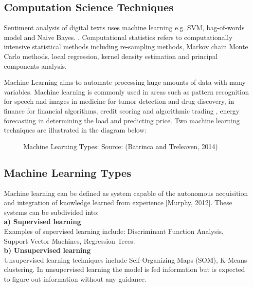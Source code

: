 \subsection{Computation Science Techniques}
Sentiment analysis of digital texts uses machine learning e.g.  SVM, bag-of-words model and Naive Bayes.
\cite{ref26}. Computational statistics refers to computationally intensive statistical methods
including re-sampling methods, Markov chain Monte Carlo methods, local regression, kernel
density estimation and principal components analysis. 

Machine Learning aims to automate processing huge amounts of data with many variables. Machine learning is commonly used in areas such as pattern recognition for speech and  images
in medicine for tumor detection and drug discovery, in finance for financial algorithms, credit scoring and algorithmic trading \cite{ref27}, energy forecasting in determining the load and predicting price.
Two machine learning techniques are illustrated in the diagram below:


\begin{figure}[h]
  \centering
  \caption[Machine learning types]%
  {Machine Learning Types: Source: (Batrinca and Treleaven, 2014)}
  \label{fig:ALAP:sm3}
\end{figure}


\clearpage
\subsection{Machine Learning Types}

Machine learning can be defined as system capable of the autonomous acquisition and integration of knowledge learned from experience [Murphy, 2012].
These systems can be subdivided into:
\leavevmode\\
\textbf{a) Supervised learning}\\
Examples of supervised learning include: Discriminant Function Analysis, Support Vector Machines, Regression Trees.\\
\textbf{b) Unsupervised learning}\\
Unsupervised learning techniques include Self-Organizing Maps (SOM), K-Means clustering.
In unsupervised learning the model is fed information but is expected to figure out information without any guidance.
\leavevmode\\

